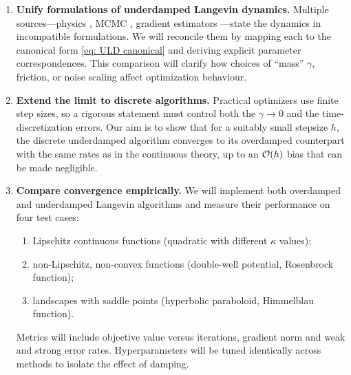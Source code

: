 \documentclass[12pt]{article}
\begin{document}
\begin{enumerate}
\item \textbf{Unify formulations of underdamped Langevin dynamics.}
      Multiple sources---physics \cite{l08}, MCMC \cite{c18}, gradient estimators \cite{qw20}---state the dynamics in incompatible formulations.
      We will reconcile them by mapping each to the canonical form \eqref{eq: ULD canonical} and deriving explicit parameter correspondences.  This comparison will clarify how choices of ``mass'' \(\gamma\), friction, or noise scaling affect optimization behaviour.


\item \textbf{Extend the limit to discrete algorithms.}
      Practical optimizers use finite step sizes, so a rigorous statement must control both the \(\gamma\to0\) and the time‐discretization errors.  Our aim is to show that for a suitably small stepsize \(h\), the discrete underdamped algorithm converges to its overdamped counterpart with the same rates as in the continuous theory, up to an \(\mathcal{O}(h)\) bias that can be made negligible.

\item \textbf{Compare convergence empirically.}
      We will implement both overdamped and underdamped Langevin algorithms and measure their performance on four test cases:
      \begin{enumerate}
        \item Lipschitz continuous functions (quadratic with different $\kappa$ values);
        \item non-Lipschitz, non-convex functions (double-well potential, Rosenbrock function);
        \item landscapes with saddle points (hyperbolic paraboloid, Himmelblau function).
      \end{enumerate}
      Metrics will include objective value versus iterations, gradient norm and weak and strong error rates.
      Hyperparameters will be tuned identically across methods to isolate the effect of damping.
\end{enumerate}
\end{document}

